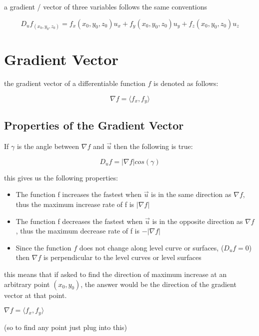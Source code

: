 \documentclass{article}
\begin{document}
a gradient / vector of three variables follows the same conventions

$$D_uf_{(x_0, y_0, z_0)} = f_x(x_0, y_0, z_0)u_x + f_y(x_0, y_0, z_0)u_y + f_z(x_0, y_0, z_0)u_z$$

\section{Gradient Vector}

the gradient vector of a differentiable function $f$ is denoted as follows:

$$\nabla f = \langle f_x, f_y \rangle$$

\subsection{Properties of the Gradient Vector}

If $\gamma$ is the angle between $\nabla f$ and $\vec{u}$ then the following is true:

$$D_uf = |\nabla f| cos(\gamma)$$

this gives us the following properties:

\begin{itemize}
    \item The function f increases the fastest when $\vec{u}$ is in the same direction as $\nabla f$, thus the maximum increase rate of f is $|\nabla f|$
    \item The function f decreases the fastest when $\vec{u}$ is in the opposite direction as $\nabla f$, thus the maximum decrease rate of f is $-|\nabla f|$
    \item Since the function $f$ does not change along level curve or surfaces, ($D_uf = 0$) then $\nabla f$ is perpendicular to the level curves or level surfaces
\end{itemize}

this means that if asked to find the direction of maximum increase at an arbitrary point $(x_0,y_0)$, the answer would be the direction of the gradient vector at that point.

$\nabla f = \langle f_x, f_y \rangle$ 

(so to find any point just plug into this)
\end{document}
